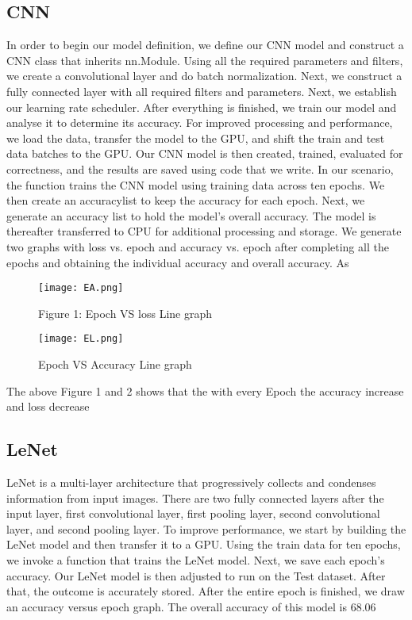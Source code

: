 \documentclass[10pt,twocolumn,letterpaper]{article}
\begin{document}
\subsection{CNN}
In order to begin our model definition, we define our CNN model and construct a CNN class that inherits nn.Module. Using all the required parameters and filters, we create a convolutional layer and do batch normalization. Next, we construct a fully connected layer with all required filters and parameters. Next, we establish our learning rate scheduler. After everything is finished, we train our model and analyse it to determine its accuracy. For improved processing and performance, we load the data, transfer the model to the GPU, and shift the train and test data batches to the GPU. 
Our CNN model is then created, trained, evaluated for correctness, and the results are saved using code that we write. In our scenario, the function trains the CNN model using training data across ten epochs. We then create an accuracylist to keep the accuracy for each epoch. Next, we generate an accuracy list to hold the model's overall accuracy. The model is thereafter transferred to CPU for additional processing and storage. We generate two graphs with loss vs. epoch and accuracy vs. epoch after completing all the epochs and obtaining the individual accuracy and overall accuracy. As 
\begin{figure}[h]
    \centering
    \texttt{[image: EA.png]}
    \caption{Figure 1: Epoch VS loss Line graph}
    \label{fig:example_image}
\end{figure}

\begin{figure}[h]
    \centering
    \texttt{[image: EL.png]}
    \caption{Epoch VS Accuracy Line graph}
    \label{fig:example_image}
\end{figure}
\text{}
The above Figure 1 and 2 shows that the with every Epoch the accuracy increase and loss decrease 


\subsection{LeNet}
LeNet is a multi-layer architecture that progressively collects and condenses information from input images. There are two fully connected layers after the input layer, first convolutional layer, first pooling layer, second convolutional layer, and second pooling layer. To improve performance, we start by building the LeNet model and then transfer it to a GPU. Using the train data for ten epochs, we invoke a function that trains the LeNet model. Next, we save each epoch's accuracy. Our LeNet model is then adjusted to run on the Test dataset. After that, the outcome is accurately stored. After the entire epoch is finished, we draw an accuracy versus epoch graph. The overall accuracy of this model is 68.06%
\end{document}
